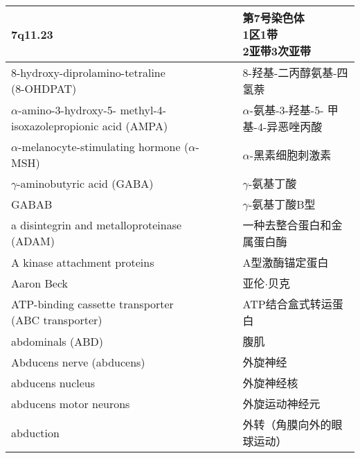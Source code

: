 \begin{longtable}{lll}
 	\midrule
 	7q11.23    && \makecell[l]{第7号染色体\\1区1带\\2亚带3次亚带}   \\
 	
 	\midrule
 	\makecell[l]{8-hydroxy-diprolamino-tetraline\\ (8-OHDPAT)}    && 8-羟基-二丙醇氨基-四氢萘   \\
 	
 	\midrule
 	\makecell[l]{$\alpha$-amino-3-hydroxy-5-\\methyl-4-isoxazolepropionic acid (AMPA)}   && \makecell[l]{$\alpha$-氨基-3-羟基-5-\\甲基-4-异恶唑丙酸}   \\
 	
 	\midrule
 	$\alpha$-melanocyte-stimulating hormone ($\alpha$-MSH)    && $\alpha$-黑素细胞刺激素   \\
 	
 	\midrule
 	$\gamma$-aminobutyric acid (GABA)    && $\gamma$-氨基丁酸   \\
 	
 	\midrule
 	GABAB    && $\gamma$-氨基丁酸B型   \\
 	
 	\midrule
 	a disintegrin and metalloproteinase (ADAM)    && 一种去整合蛋白和金属蛋白酶   \\
 	
 	\midrule
 	A kinase attachment proteins     && A型激酶锚定蛋白   \\
 	
 	\midrule
 	Aaron Beck     && 亚伦$\cdot$贝克   \\
 	
 	\midrule
 	\makecell[l]{ATP-binding cassette transporter\\ (ABC transporter)}     && ATP结合盒式转运蛋白   \\
 	
 	\midrule
 	abdominals (ABD)     && 腹肌   \\
 
 	\midrule
 	Abducens nerve (abducens)     && 外旋神经   \\
 	
 	\midrule
 	abducens nucleus     && 外旋神经核   \\
 	
 	\midrule
 	abducens motor neurons     && 外旋运动神经元   \\
 
 	\midrule
 	abduction     && 外转（角膜向外的眼球运动）   \\
 	

\end{longtable}
